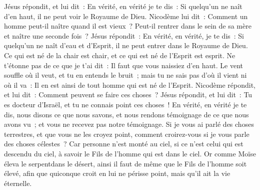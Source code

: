 \begin{multicols}{2}
Jésus répondit, et lui dit~: En vérité, en vérité je te dis~: Si quelqu'un ne naît d'en haut, il ne peut voir le Royaume de Dieu.
Nicodème lui dit~: Comment un homme peut-il naître quand il est vieux~? Peut-il rentrer dans le sein de sa mère et naître une seconde fois~?
Jésus répondit~: En vérité, en vérité, je te dis~: Si quelqu'un ne naît d'eau et d'Esprit, il ne peut entrer dans le Royaume de Dieu.
Ce qui est né de la chair est chair, et ce qui est né de l'Esprit est esprit.
Ne t'étonne pas de ce que je t'ai dit~: Il faut que vous naissiez d'en haut.
Le vent souffle où il veut, et tu en entends le bruit~; mais tu ne sais pas d'où il vient ni où il va~: Il en est ainsi de tout homme qui est né de l'Esprit.
Nicodème répondit, et lui dit~: Comment peuvent se faire ces choses~?
Jésus répondit, et lui dit~: Tu es docteur d'Israël, et tu ne connais point ces choses~!
En vérité, en vérité je te dis, nous disons ce que nous savons, et nous rendons témoignage de ce que nous avons vu~; et vous ne recevez pas notre témoignage.
Si je vous ai parlé des choses terrestres, et que vous ne les croyez point, comment croirez-vous si je vous parle des choses célestes~?
Car personne n'est monté au ciel, si ce n'est celui qui est descendu du ciel, à savoir le Fils de l'homme qui est dans le ciel.
Or comme Moïse éleva le serpentdans le désert, ainsi il faut de même que le Fils de l'homme soit élevé,
afin que quiconque croit en lui ne périsse point, mais qu'il ait la vie éternelle.

\end{multicols}
